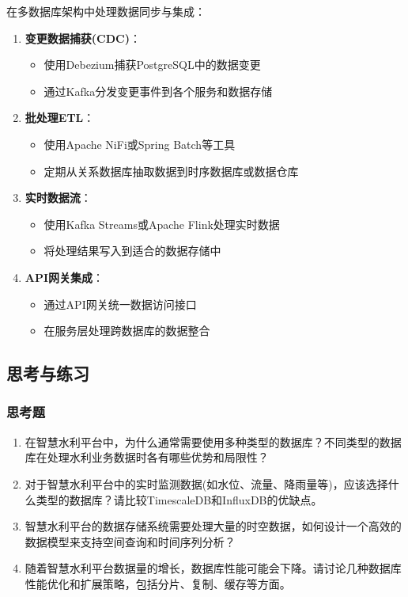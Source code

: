 在多数据库架构中处理数据同步与集成：

\begin{enumerate}
\def\labelenumi{\arabic{enumi}.}
\tightlist
\item
  \textbf{变更数据捕获(CDC)}：

  \begin{itemize}
  \tightlist
  \item
    使用Debezium捕获PostgreSQL中的数据变更
  \item
    通过Kafka分发变更事件到各个服务和数据存储
  \end{itemize}
\item
  \textbf{批处理ETL}：

  \begin{itemize}
  \tightlist
  \item
    使用Apache NiFi或Spring Batch等工具
  \item
    定期从关系数据库抽取数据到时序数据库或数据仓库
  \end{itemize}
\item
  \textbf{实时数据流}：

  \begin{itemize}
  \tightlist
  \item
    使用Kafka Streams或Apache Flink处理实时数据
  \item
    将处理结果写入到适合的数据存储中
  \end{itemize}
\item
  \textbf{API网关集成}：

  \begin{itemize}
  \tightlist
  \item
    通过API网关统一数据访问接口
  \item
    在服务层处理跨数据库的数据整合
  \end{itemize}
\end{enumerate}

\subsection{思考与练习}\label{ux601dux8003ux4e0eux7ec3ux4e60}

\subsubsection{思考题}\label{ux601dux8003ux9898}

\begin{enumerate}
\def\labelenumi{\arabic{enumi}.}
\item
  在智慧水利平台中，为什么通常需要使用多种类型的数据库？不同类型的数据库在处理水利业务数据时各有哪些优势和局限性？
\item
  对于智慧水利平台中的实时监测数据(如水位、流量、降雨量等)，应该选择什么类型的数据库？请比较TimescaleDB和InfluxDB的优缺点。
\item
  智慧水利平台的数据存储系统需要处理大量的时空数据，如何设计一个高效的数据模型来支持空间查询和时间序列分析？
\item
  随着智慧水利平台数据量的增长，数据库性能可能会下降。请讨论几种数据库性能优化和扩展策略，包括分片、复制、缓存等方面。
\end{enumerate}

